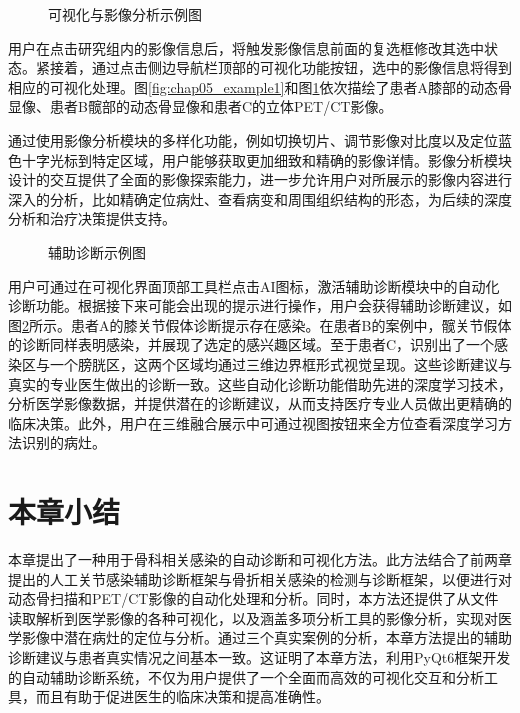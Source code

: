 \begin{figure}[t]
    \centering
    \hfill
    \caption{可视化与影像分析示例图}
    \label{fig:chap05_example2}
\end{figure}

用户在点击研究组内的影像信息后，将触发影像信息前面的复选框修改其选中状态。紧接着，通过点击侧边导航栏顶部的可视化功能按钮，选中的影像信息将得到相应的可视化处理。图\ref{fig:chap05_example1}和图\ref{fig:chap05_example2}依次描绘了患者A膝部的动态骨显像、患者B髋部的动态骨显像和患者C的立体PET/CT影像。

通过使用影像分析模块的多样化功能，例如切换切片、调节影像对比度以及定位蓝色十字光标到特定区域，用户能够获取更加细致和精确的影像详情。影像分析模块设计的交互提供了全面的影像探索能力，进一步允许用户对所展示的影像内容进行深入的分析，比如精确定位病灶、查看病变和周围组织结构的形态，为后续的深度分析和治疗决策提供支持。

\begin{figure}[b]
    \centering
    \hfill
    \newline
    \hfill
    \caption{辅助诊断示例图}\label{fig:chap05_result}
\end{figure}

用户可通过在可视化界面顶部工具栏点击AI图标，激活辅助诊断模块中的自动化诊断功能。根据接下来可能会出现的提示进行操作，用户会获得辅助诊断建议，如图\ref{fig:chap05_result}所示。患者A的膝关节假体诊断提示存在感染。在患者B的案例中，髋关节假体的诊断同样表明感染，并展现了选定的感兴趣区域。至于患者C，识别出了一个感染区与一个膀胱区，这两个区域均通过三维边界框形式视觉呈现。这些诊断建议与真实的专业医生做出的诊断一致。这些自动化诊断功能借助先进的深度学习技术，分析医学影像数据，并提供潜在的诊断建议，从而支持医疗专业人员做出更精确的临床决策。此外，用户在三维融合展示中可通过视图按钮来全方位查看深度学习方法识别的病灶。

\section{本章小结}

本章提出了一种用于骨科相关感染的自动诊断和可视化方法。此方法结合了前两章提出的人工关节感染辅助诊断框架与骨折相关感染的检测与诊断框架，以便进行对动态骨扫描和PET/CT影像的自动化处理和分析。同时，本方法还提供了从文件读取解析到医学影像的各种可视化，以及涵盖多项分析工具的影像分析，实现对医学影像中潜在病灶的定位与分析。通过三个真实案例的分析，本章方法提出的辅助诊断建议与患者真实情况之间基本一致。这证明了本章方法，利用PyQt6框架开发的自动辅助诊断系统，不仅为用户提供了一个全面而高效的可视化交互和分析工具，而且有助于促进医生的临床决策和提高准确性。